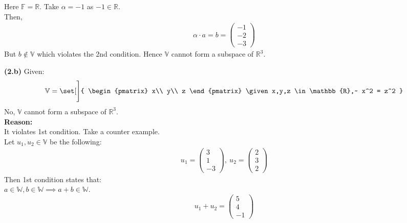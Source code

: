 \documentclass[12pt,letterpaper,fleqn]{article}
\theoremstyle{definition}
\begin{document}
	Here $\mathbb{F} = \mathbb{R}$. Take $\alpha = -1$ as $-1 \in \mathbb{R}$.\\
	Then,
	\begin{equation*}
	\begin{split}
	\alpha \cdot a = b = \begin{pmatrix}
	-1\\
	-2\\
	-3
	\end{pmatrix}
	\end{split}
	\end{equation*}
	But $ b \notin \mathbb{V}$ which violates the 2nd condition. Hence $\mathbb{V}$ cannot form a subspace of $\mathbb{R}^{3}$.

 \textbf{(2.b)} Given:
	\begin{align*}
	\mathbb{V} = \set[\Bigg]{
	\begin{pmatrix}
	x\\
	y\\
	z
\end{pmatrix}	\given x,y,z \in \mathbb{R},~ x^2 = z^2	
	}
	\end{align*}
	No, $\mathbb{V}$ cannot form a subspace of $\mathbb{R}^{3}$.\\
	\textbf{Reason:}\\
	It violates 1st condition. Take a counter example.\\
	Let $ u_1,u_2 \in \mathbb{V}$ be the following:
	\begin{equation*}
	\begin{split}
	u_1 = \begin{pmatrix}
	3\\
	1\\
	-3
	\end{pmatrix},~
	u_2 = \begin{pmatrix}
	2\\
	3\\
	2
	\end{pmatrix}
	\end{split}
	\end{equation*}
	Then 1st condition states that:\\
	$ a \in \mathbb{W}, b \in \mathbb{W} \implies a + b \in \mathbb{W}$.\\
	\begin{equation*}
	u_1 + u_2 = \begin{pmatrix}
	5\\
	4\\
	-1
	\end{pmatrix}
	\end{equation*}	 
\end{document}

